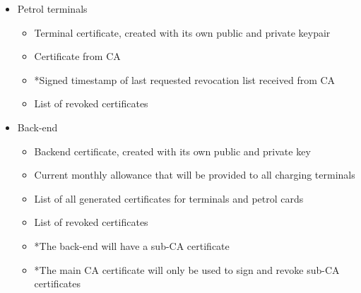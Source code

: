 \begin{itemize}
 
 \item Petrol terminals
 \begin{itemize}
  	\item Terminal certificate, created with its own public and private keypair
  	\item Certificate from CA
 	\item  *Signed timestamp of last requested revocation list received from CA
 	\item List of revoked certificates
 \end{itemize}

 \item Back-end
 \begin{itemize}
 	\item Backend certificate, created with its own public and private key
 	\item Current monthly allowance that will be provided to all charging terminals
 	\item List of all generated certificates for terminals and petrol cards
 	\item List of revoked certificates
 	\item *The back-end will have a sub-CA certificate
 	\item *The main CA certificate will only be used to sign and revoke sub-CA certificates
 \end{itemize}
\end{itemize}

